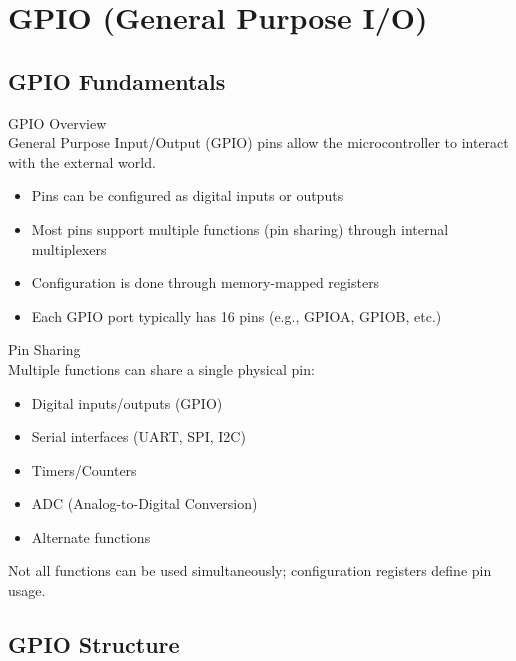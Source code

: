\section{GPIO (General Purpose I/O)}

\subsection{GPIO Fundamentals}

\begin{concept}{GPIO Overview}\\
General Purpose Input/Output (GPIO) pins allow the microcontroller to interact with the external world.
\begin{itemize}
    \item Pins can be configured as digital inputs or outputs
    \item Most pins support multiple functions (pin sharing) through internal multiplexers
    \item Configuration is done through memory-mapped registers
    \item Each GPIO port typically has 16 pins (e.g., GPIOA, GPIOB, etc.)
\end{itemize}
\end{concept}

\begin{definition}{Pin Sharing}\\
Multiple functions can share a single physical pin:
\begin{itemize}
    \item Digital inputs/outputs (GPIO)
    \item Serial interfaces (UART, SPI, I2C)
    \item Timers/Counters
    \item ADC (Analog-to-Digital Conversion)
    \item Alternate functions
\end{itemize}
Not all functions can be used simultaneously; configuration registers define pin usage.
\end{definition}

\subsection{GPIO Structure}


